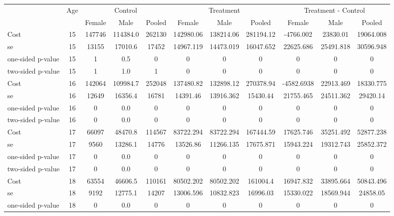 \begin{tabular}{lcccccccccc} \hline \hline
 &Age & \multicolumn{3}{c}{Control} & \multicolumn{3}{c}{Treatment} & \multicolumn{3}{c}{Treatment - Control} \\ 
& & Female  & Male  & Pooled  & Female  & Male  & Pooled  & Female  & Male  & Pooled  \\  \hline 
Cost 			  &        15 &    147746 &  114384.0 &    262130 & 142980.06 & 138214.06 & 281194.12 & -4766.002 & 23830.01 & 19064.008 \\  
se 				 &        15 &     13155 &   17010.6 &     17452 & 14967.119 & 14473.019 & 16047.652 & 22625.686 & 25491.818 & 30596.948 \\  
one-sided p-value&        15 &         1 &       0.5 &         0 & 0 & 0 & 0 & 0 & 0 & 0 \\  
two-sided p-value&        15 &         1 &       1.0 &         1 & 0 & 0 & 0 & 0 & 0 & 0 \\  
Cost 			  &        16 &    142064 &  109984.7 &    252048 & 137480.82 & 132898.12 & 270378.94 & -4582.6938 & 22913.469 & 18330.775 \\  
se 				 &        16 &     12649 &   16356.4 &     16781 & 14391.46 & 13916.362 & 15430.44 & 21755.465 & 24511.362 & 29420.14 \\  
one-sided p-value&        16 &         0 &       0.0 &         0 & 0 & 0 & 0 & 0 & 0 & 0 \\  
two-sided p-value&        16 &         0 &       0.0 &         0 & 0 & 0 & 0 & 0 & 0 & 0 \\  
Cost 			  &        17 &     66097 &   48470.8 &    114567 & 83722.294 & 83722.294 & 167444.59 & 17625.746 & 35251.492 & 52877.238 \\  
se 				 &        17 &      9560 &   13286.1 &     14776 & 13526.86 & 11266.135 & 17675.871 & 15943.224 & 19312.743 & 25852.372 \\  
one-sided p-value&        17 &         0 &       0.0 &         0 & 0 & 0 & 0 & 0 & 0 & 0 \\  
two-sided p-value&        17 &         0 &       0.0 &         0 & 0 & 0 & 0 & 0 & 0 & 0 \\  
Cost 			  &        18 &     63554 &   46606.5 &    110161 & 80502.202 & 80502.202 & 161004.4 & 16947.832 & 33895.664 & 50843.496 \\  
se 				  &       18 &      9192 &   12775.1 &     14207 & 13006.596 & 10832.823 & 16996.03 & 15330.022 & 18569.944 & 24858.05 \\  
one-sided p-value &       18 &         0 &       0.0 &         0 & 0 & 0 & 0 & 0 & 0 & 0 \\  

\end{tabular}
